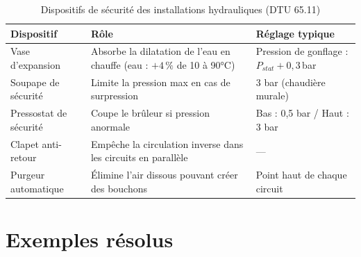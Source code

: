 \begin{table}[H]
  \centering
  \caption{Dispositifs de sécurité des installations hydrauliques (DTU 65.11)}
  \begin{tabular}{p{3.5cm}p{4.5cm}p{4.5cm}}
    \toprule
    Dispositif & Rôle & Réglage typique \\
    \midrule
    Vase d'expansion & Absorbe la dilatation de l'eau en chauffe (eau : $+4\,\%$ de 10 à 90°C) & Pression de gonflage : $P_{stat} + 0{,}3$\,bar \\
    Soupape de sécurité & Limite la pression max en cas de surpression & 3 bar (chaudière murale) \\
    Pressostat de sécurité & Coupe le brûleur si pression anormale & Bas : 0,5 bar / Haut : 3 bar \\
    Clapet anti-retour & Empêche la circulation inverse dans les circuits en parallèle & — \\
    Purgeur automatique & Élimine l'air dissous pouvant créer des bouchons & Point haut de chaque circuit \\
    \bottomrule
  \end{tabular}
\end{table}

\section{Exemples résolus}

